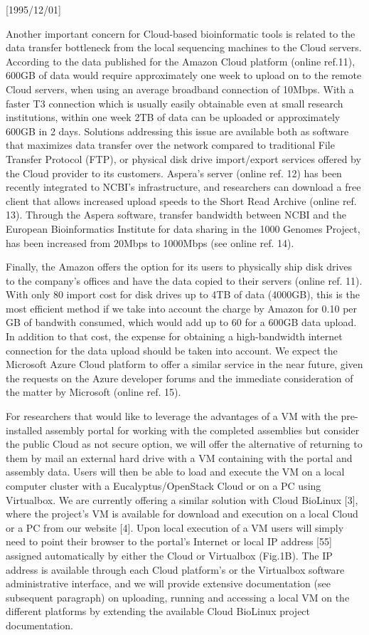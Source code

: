 \NeedsTeXFormat{LaTeX2e}[1995/12/01] \documentclass[10pt]{bmc_article}
\newenvironment{bmcformat}{\begin{raggedright}\baselineskip20pt\sloppy\setboolean{publ}{false}}{\end{raggedright}\baselineskip20pt\sloppy}
\begin{document}
\begin{bmcformat}
Another important concern for Cloud-based bioinformatic tools is related to the data transfer bottleneck from
the local sequencing machines to the Cloud servers.  According to the data published for the Amazon Cloud
platform (online ref.11), 600GB of data would require approximately one week to upload on to the remote Cloud
servers, when using an average broadband connection of 10Mbps. With a faster T3 connection which is usually
easily obtainable even at small research institutions, within one week 2TB of data can be uploaded or
approximately 600GB in 2 days.  Solutions addressing this issue are available both as software that maximizes
data transfer over the network compared to traditional File Transfer Protocol (FTP), or physical disk drive
import/export services offered by the Cloud provider to its customers. Aspera's server (online ref. 12) has
been recently integrated to NCBI's infrastructure, and researchers can download a free client that allows
increased upload speeds to the Short Read Archive (online ref. 13).  Through the Aspera software, transfer
bandwidth between NCBI and the European Bioinformatics Institute for data sharing in the 1000 Genomes Project,
has been increased from 20Mbps to 1000Mbps (see online ref. 14). 

Finally, the Amazon offers the option for its users to physically ship disk drives to the company's offices
and have the data copied to their servers (online ref. 11). With only 80 import cost for disk drives up to 4TB
of data (4000GB), this is the most efficient method if we take into account the charge by Amazon for 0.10 per
GB of bandwith consumed, which would add up to 60 for a 600GB data upload. In addition to that cost, the
expense for obtaining a high-bandwidth internet connection for the data upload should be taken into account.
We expect the Microsoft Azure Cloud platform to offer a similar service in the near future, given the requests
on the Azure developer forums and the immediate consideration of the matter by Microsoft (online ref. 15).

For researchers that would like to leverage the advantages of a VM with the pre-installed assembly portal for
working with the completed assemblies but consider the public Cloud as not secure option, we will offer the
alternative of returning to them by mail an external hard drive with a VM containing with the portal and
assembly data. Users will then be able to load and execute the VM on a local computer cluster with a
Eucalyptus/OpenStack Cloud or on a PC using Virtualbox. We are currently offering a similar solution with
Cloud BioLinux [3], where the project's VM is available for download and execution on a local Cloud or a PC
from our website [4].  Upon local execution of a VM users will simply need to point their browser to the
portal's Internet or local IP address [55] assigned automatically by either the Cloud or Virtualbox (Fig.1B).
The IP address is available through each Cloud platform's or the Virtualbox software administrative
interface, and we will provide extensive documentation (see subsequent paragraph) on uploading, running and
accessing a local VM on the different platforms by extending the available Cloud BioLinux project
documentation.


\end{bmcformat}
\end{document}
